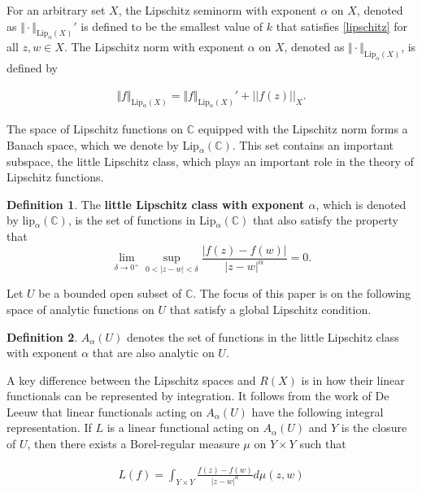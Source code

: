 \documentclass{article}
\theoremstyle{definition}
\newtheorem{definition}{Definition}
\begin{document}
\noindent For an arbitrary set $X$, the Lipschitz seminorm with exponent $\alpha$ on $X$, denoted as $\Vert \cdot\Vert _{\text{Lip}_{\alpha}(X)}'$ is defined to be the smallest value of $k$ that satisfies \eqref{lipschitz} for all $z,w \in X$. The Lipschitz norm with exponent $\alpha$ on $X$, denoted as $\Vert \cdot\Vert _{\text{Lip}_{\alpha}(X)}$, is defined by

\begin{align*}
    \Vert f\Vert _{\text{Lip}_{\alpha}(X)} = \Vert f\Vert _{\text{Lip}_{\alpha}(X)}' +  ||f(z)||_{X}.
\end{align*}

The space of Lipschitz functions on $\mathbb C$ equipped with the Lipschitz norm forms a Banach space, which we denote by Lip$_\alpha(\mathbb C)$. This set contains an important subspace, the little Lipschitz class, which plays an important role in the theory of Lipschitz functions.

\begin{definition}
The \textbf{little Lipschitz class with exponent $\alpha$}, which is denoted by lip$_\alpha(\mathbb C)$, is the set of functions in Lip$_\alpha(\mathbb C)$ that also satisfy the property that 
\begin{equation*}
    \lim_{\delta \to 0^+} \sup_{0<|z-w|<\delta} \dfrac{|f(z)-f(w)|}{|z-w|^{\alpha}} = 0.
\end{equation*}
\end{definition}

\noindent Let $U$ be a bounded open subset of $\mathbb C$. The focus of this paper is on the following space of analytic functions on $U$ that satisfy a global Lipschitz condition. 

\begin{definition}
 $A_{\alpha}(U)$ denotes the set of functions in the little Lipschitz class with exponent $\alpha$ that are also analytic on $U$. 
\end{definition}


A key difference between the Lipschitz spaces and $R(X)$ is in how their linear functionals can be represented by integration. It follows from the work of De Leeuw \cite{deLeeuw1961} that linear functionals acting on $A_{\alpha}(U)$ have the following integral representation. If $L$ is a linear functional acting on $A_{\alpha}(U)$ and $Y$ is the closure of $U$, then there exists a Borel-regular measure $\mu$ on $Y \times Y$ such that

\begin{align*}
    L(f) = \int_{Y \times Y} \frac{f(z)-f(w)}{|z-w|^{\alpha}} d\mu(z,w)
\end{align*}
\end{document}
